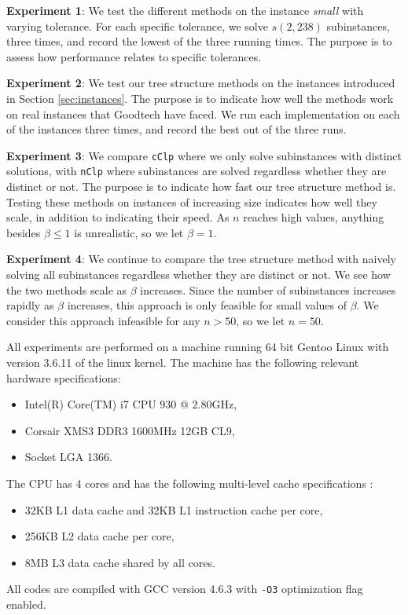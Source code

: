 \textbf{Experiment 1}:
We test the different
methods on the instance \textit{small} with varying tolerance.
For each specific tolerance, we solve $s(2, 238)$ subinstances, three times,
and record the lowest of the three running times.
The purpose is to assess how performance relates to specific tolerances.

\textbf{Experiment 2}:
We test our tree structure methods on the instances introduced in Section
\ref{sec:instances}.
The purpose is to indicate how well the methods work
on real instances that Goodtech have faced.
We run each implementation on each of the instances three times, and record
the best out of the three runs.

\textbf{Experiment 3}:
We compare \texttt{cClp} where we only solve subinstances with distinct
solutions, with \texttt{nClp} where subinstances are solved regardless
whether they are distinct or not.
The purpose is to indicate how fast our tree structure method is.
Testing these methods on instances of increasing size indicates how well
they scale, in addition to indicating their speed. 
As $n$ reaches high values, anything besides $\beta \leq 1$ is unrealistic,
so we let $\beta = 1$.

\textbf{Experiment 4}:
We continue to compare the tree structure method with naively solving all
subinstances regardless whether they are distinct or not. We
see how the two methods scale as $\beta$ increases. Since the number
of subinstances increases rapidly as $\beta$ increases, this approach is only
feasible for small values of $\beta$. We consider this approach infeasible for
any $n > 50$, so we let $n = 50$.

All experiments are performed on a machine running 64 bit Gentoo Linux
with version 3.6.11 of the linux kernel. The machine has the following
relevant hardware specifications:
\begin{itemize}
    \item Intel(R) Core(TM) i7 CPU 930 @ 2.80GHz,
    \item Corsair XMS3 DDR3 1600MHz 12GB CL9,
    \item Socket LGA 1366.
\end{itemize}
The CPU has 4 cores and has the following multi-level cache specifications
\cite{intel}:
\begin{itemize}
    \item 32KB L1 data cache and 32KB L1 instruction cache per core,
    \item 256KB L2 data cache per core,
    \item 8MB L3 data cache shared by all cores.
\end{itemize}

All codes are compiled with GCC version 4.6.3 with \texttt{-O3}
optimization flag enabled.
